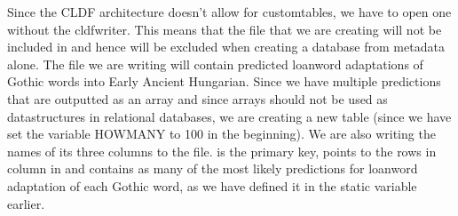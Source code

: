 \documentclass[letterpaper,10pt,english]{sphinxmanual}
\begin{document}
{{{{\sphinxAtStartPar
Since the CLDF architecture doesn’t allow for custom\sphinxhyphen{}tables, we have to
open one without the cldf\sphinxhyphen{}writer. This means that the file that we are
creating will not be included in  and hence will
be excluded when creating a database from metadata alone. The file we are
writing will contain predicted loanword adaptations of Gothic words into
Early Ancient Hungarian. Since we have multiple predictions that are
outputted as an array and since arrays should not be used as data\sphinxhyphen{}structures
in relational databases, we are creating a new table 
(since we have set the variable HOWMANY to 100 in the beginning). We
are also writing the names of its three columns to the file.  is the
primary key,  points to the rows in column  in
 and  contains as many of the most likely
predictions for loanword adaptation of each Gothic word, as we have defined
it in the static variable  earlier.

\begin{sphinxVerbatim}[commandchars=\\\{\}]
    
      


\end{sphinxVerbatim}}}}}
\end{document}
